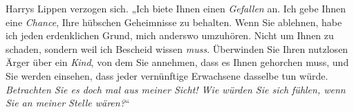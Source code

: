 Harrys Lippen verzogen sich.
„Ich biete Ihnen einen \emph{Gefallen} an. Ich gebe Ihnen eine \emph{Chance}, Ihre hübschen Geheimnisse zu behalten. Wenn Sie ablehnen, habe ich jeden erdenklichen Grund, mich anderswo umzuhören. Nicht um Ihnen zu schaden, sondern weil ich Bescheid wissen \emph{muss}. Überwinden Sie Ihren nutzlosen Ärger über ein \emph{Kind}, von dem Sie annehmen, dass es Ihnen gehorchen muss, und Sie werden einsehen, dass jeder vernünftige Erwachsene dasselbe tun würde. \emph{Betrachten Sie es doch mal aus meiner Sicht! Wie würden Sie sich fühlen, wenn Sie an meiner Stelle wären?}“

